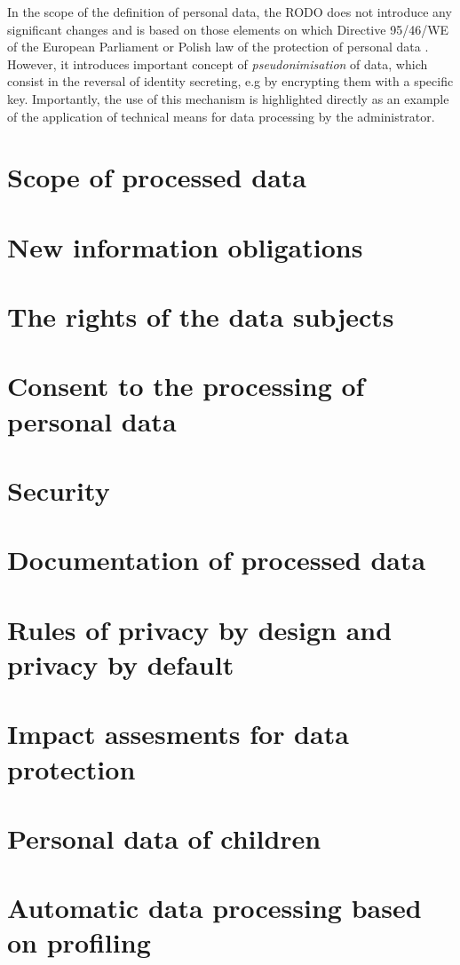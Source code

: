 \documentclass[en, noamssymb]{mgr}
\begin{document}
In the scope of the definition of personal data, the RODO does not introduce any significant changes and is based on those elements on which Directive 95/46/WE of the European Parliament \cite{95/46/we} or Polish law of the protection of personal data \cite{uodo}. However, it introduces important concept of \textit{pseudonimisation} of data, which consist in the reversal of identity secreting, e.g by encrypting them with a specific key. Importantly, the use of this mechanism is highlighted directly as an example of the application of technical means for data processing by the administrator.  

\section{Scope of processed data}
\section{New information obligations}
\section{The rights of the data subjects}
\section{Consent to the processing of personal data}
\section{Security}
\section{Documentation of processed data}
\section{Rules of privacy by design and privacy by default}
\section{Impact assesments for data protection}
\section{Personal data of children}
\section{Automatic data processing based on profiling}
\end{document}
